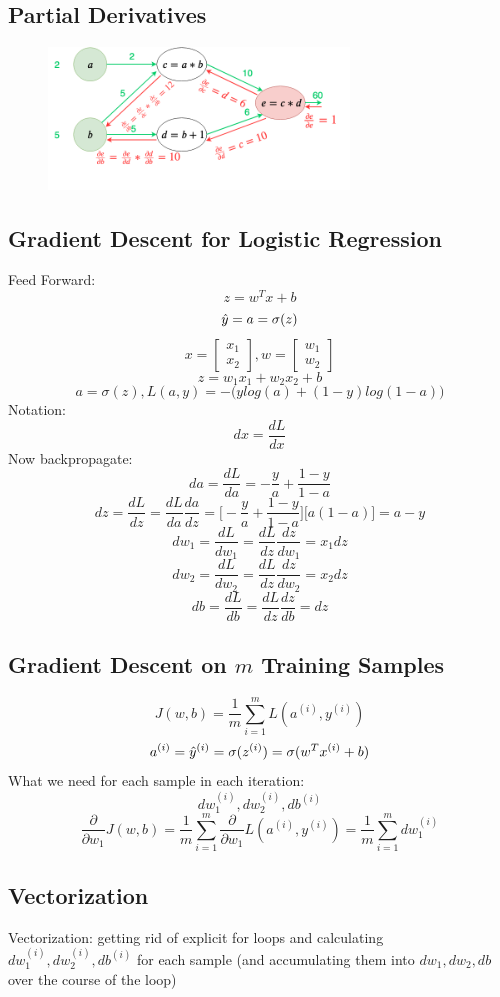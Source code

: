 \subsection{Partial Derivatives}
\begin{figure}[h]
\includegraphics[width=8cm]{images/partial.png}
\centering
\end{figure}

\subsection{Gradient Descent for Logistic Regression}
Feed Forward: 
$$
z = w^Tx + b
$$
$$
\hat{y} = a = \sigma(z)
$$
$$
x = \begin{bmatrix}
x_1\\
x_2
\end{bmatrix}, 
w = \begin{bmatrix}
w_1\\
w_2
\end{bmatrix}
$$
$$
z = w_1x_1 + w_2x_2 + b
$$
$$
a = \sigma(z), L(a, y) = -\Big(ylog(a) + (1-y)log(1-a)\Big)
$$
Notation: 
$$
dx = \frac{dL}{dx}
$$
Now backpropagate: 
$$
da = \frac{dL}{da} = -\frac{y}{a} + \frac{1-y}{1-a}
$$
$$
dz = \frac{dL}{dz} = \frac{dL}{da}\frac{da}{dz} = \Big[-\frac{y}{a} + \frac{1-y}{1-a}\Big]\Big[a(1-a)\Big] = a - y
$$
$$
dw_1 = \frac{dL}{dw_1} = \frac{dL}{dz}\frac{dz}{dw_1} = x_1 dz
$$
$$
dw_2 = \frac{dL}{dw_2} = \frac{dL}{dz}\frac{dz}{dw_2} = x_2 dz
$$
$$
db = \frac{dL}{db} = \frac{dL}{dz}\frac{dz}{db} = dz
$$
\subsection{Gradient Descent on $m$ Training Samples}
$$
J(w, b) = \frac{1}{m}\sum_{i=1}^{m} L(a^{(i)}, y^{(i)})
$$
$$
a^{(i)} = \hat{y}^{(i)} = \sigma(z^{(i)}) = \sigma(w^Tx^{(i)} + b)
$$
What we need for each sample in each iteration: 
$$
dw_1^{(i)}, dw_2^{(i)}, db^{(i)}
$$
$$
\frac{\partial}{\partial w_1}J(w, b) = \frac{1}{m}\sum_{i=1}^{m} \frac{\partial}{\partial w_1} L(a^{(i)}, y^{(i)}) = \frac{1}{m}\sum_{i=1}^{m} dw_1^{(i)}
$$

\subsection{Vectorization}
Vectorization: getting rid of explicit for loops and calculating $dw_1^{(i)}, dw_2^{(i)}, db^{(i)}$ for each sample (and accumulating them into $dw_1, dw_2, db$ over the course of the loop)

